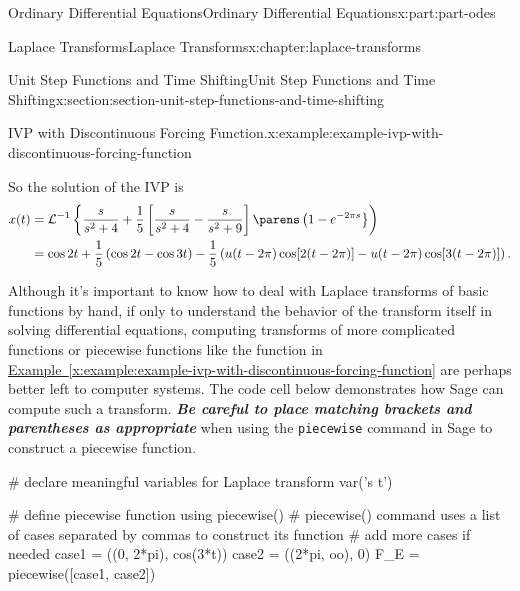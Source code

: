 \documentclass[oneside,10pt,]{book}
\newcommand{\xreffont}{\relax}
\newcommand{\mono}[1]{\texttt{#1}}
\newcommand{\alert}[1]{\textbf{\textit{#1}}}
\numberwithin{equation}{part}
\newcommand{\iLaplace}[1]{\mathcal{L}^{-1}\left\{#1\right\}}
\newcommand{\amp}{&}
\begin{document}
\begin{partptx}{Ordinary Differential Equations}{}{Ordinary Differential Equations}{}{}{x:part:part-odes}
\begin{chapterptx}{Laplace Transforms}{}{Laplace Transforms}{}{}{x:chapter:laplace-transforms}
\begin{sectionptx}{Unit Step Functions and Time Shifting}{}{Unit Step Functions and Time Shifting}{}{}{x:section:section-unit-step-functions-and-time-shifting}
\begin{example}{IVP with Discontinuous Forcing Function.}{x:example:example-ivp-with-discontinuous-forcing-function}
\begin{equation*}
\end{equation*}
%
\par
So the solution of the IVP is%
\begin{align*}
x(t) \amp= \iLaplace{\frac{s}{s^{2}+4} + \frac{1}{5}\left[\frac{s}{s^{2}+4} - \frac{s}{s^{2}+9}\right]\parens\left(1-e^{-2\pi s}}\right)\\
\amp= \cos2t + \frac{1}{5}\left(\cos2t-\cos3t\right) - \frac{1}{5}\left(u(t-2\pi)\cos[2(t-2\pi)] - u(t-2\pi)\cos[3(t-2\pi)]\right)\text{.}
\end{align*}
%
\end{example}
Although it's important to know how to deal with Laplace transforms of basic functions by hand, if only to understand the behavior of the transform itself in solving differential equations, computing transforms of more complicated functions or piecewise functions like the function in \hyperref[x:example:example-ivp-with-discontinuous-forcing-function]{Example~{\xreffont\ref{x:example:example-ivp-with-discontinuous-forcing-function}}} are perhaps better left to computer systems. The code cell below demonstrates how Sage can compute such a transform. \alert{Be careful to place matching brackets and parentheses as appropriate} when using the \mono{piecewise} command in Sage to construct a piecewise function.%
\begin{sageinput}
# declare meaningful variables for Laplace transform
var('s t')

# define piecewise function using piecewise()
# piecewise() command uses a list of cases separated by commas to construct its function
# add more cases if needed
case1 = ((0, 2*pi), cos(3*t))
case2 = ((2*pi, oo), 0)
F_E = piecewise([case1, case2])


\end{sageinput}
\end{sectionptx}
\end{chapterptx}
\end{partptx}
\end{document}
